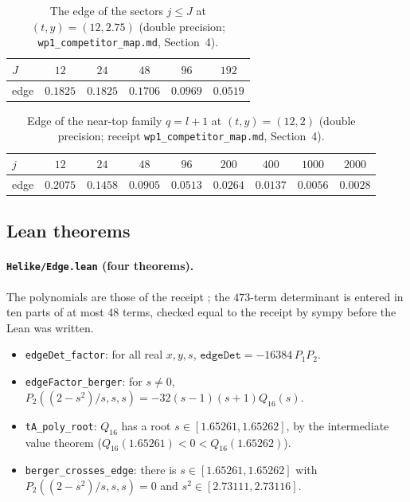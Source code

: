 \documentclass[11pt]{article}
\theoremstyle{definition}
\theoremstyle{remark}
\begin{document}
\begin{table}[ht]\centering\small
\caption{The edge of the sectors $j\le J$ at $(t,y)=(12,2.75)$ (double precision; \texttt{wp1\_competitor\_map.md},
Section~4).}\label{tab:cutoff}
\begin{tabular}{lccccc}\toprule
$J$ & $12$ & $24$ & $48$ & $96$ & $192$\\ \midrule
edge & $0.1825$ & $0.1825$ & $0.1706$ & $0.0969$ & $0.0519$\\
\bottomrule\end{tabular}
\end{table}

\begin{table}[ht]\centering\small
\caption{Edge of the near-top family $q=l+1$ at $(t,y)=(12,2)$ (double precision; receipt \texttt{wp1\_competitor\_map.md},
Section~4).}\label{tab:family}
\begin{tabular}{lcccccccc}\toprule
$j$ & $12$ & $24$ & $48$ & $96$ & $200$ & $400$ & $1000$ & $2000$\\ \midrule
edge & $0.2075$ & $0.1458$ & $0.0905$ & $0.0513$ & $0.0264$ & $0.0137$ & $0.0056$ & $0.0028$\\
\bottomrule\end{tabular}
\end{table}

\subsection{Lean theorems}\label{app:lean}

\paragraph{\texttt{Helike/Edge.lean} (four theorems).} The polynomials are those of the receipt
; the $473$-term determinant is entered in ten parts of at most $48$ terms, checked equal to
the receipt by sympy before the Lean was written.
\begin{itemize}
  \item \texttt{edgeDet\_factor}: for all real $x,y,s$, $\mathtt{edgeDet}=-16384\,P_1P_2$.
  \item \texttt{edgeFactor\_berger}: for $s\ne0$, $P_2((2-s^2)/s,s,s)=-32(s-1)(s+1)Q_{16}(s)$.
  \item \texttt{tA\_poly\_root}: $Q_{16}$ has a root $s\in[1.65261,1.65262]$, by the intermediate value theorem
    ($Q_{16}(1.65261)<0<Q_{16}(1.65262)$).
  \item \texttt{berger\_crosses\_edge}: there is $s\in[1.65261,1.65262]$ with $P_2((2-s^2)/s,s,s)=0$ and
    $s^2\in[2.73111,2.73116]$.
\end{itemize}
\end{document}
